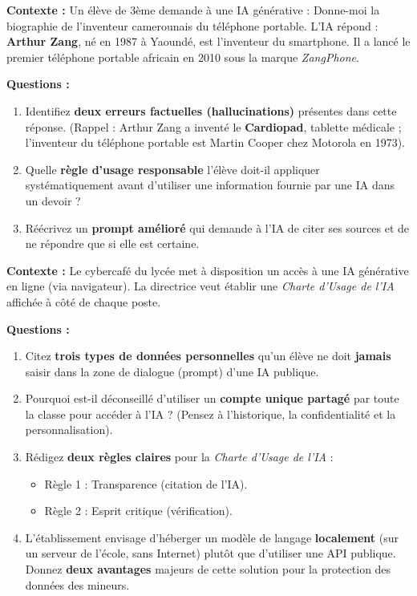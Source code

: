 \documentclass[11pt]{article}
\begin{document}
\begin{exercice}
\textbf{Contexte :} Un élève de 3ème demande à une IA générative : \og Donne-moi la biographie de l'inventeur camerounais du téléphone portable. \fg
L'IA répond : \og \textbf{Arthur Zang}, né en 1987 à Yaoundé, est l'inventeur du smartphone. Il a lancé le premier téléphone portable africain en 2010 sous la marque \textit{ZangPhone}. \fg

\textbf{Questions :}
\begin{enumerate}
    \item Identifiez \textbf{deux erreurs factuelles (hallucinations)} présentes dans cette réponse. (Rappel : Arthur Zang a inventé le \textbf{Cardiopad}, tablette médicale ; l'inventeur du téléphone portable est Martin Cooper chez Motorola en 1973).
    \item Quelle \textbf{règle d'usage responsable} l'élève doit-il appliquer systématiquement avant d'utiliser une information fournie par une IA dans un devoir ?
    \item Réécrivez un \textbf{prompt amélioré} qui demande à l'IA de citer ses sources et de ne répondre que si elle est certaine.
\end{enumerate}
\end{exercice}

\begin{exercice}
\textbf{Contexte :} Le cybercafé du lycée met à disposition un accès à une IA générative en ligne (via navigateur). La directrice veut établir une \emph{Charte d'Usage de l'IA} affichée à côté de chaque poste.

\textbf{Questions :}
\begin{enumerate}
    \item Citez \textbf{trois types de données personnelles} qu'un élève ne doit \textbf{jamais} saisir dans la zone de dialogue (prompt) d'une IA publique.
    \item Pourquoi est-il déconseillé d'utiliser un \textbf{compte unique partagé} par toute la classe pour accéder à l'IA ? (Pensez à l'historique, la confidentialité et la personnalisation).
    \item Rédigez \textbf{deux règles claires} pour la \emph{Charte d'Usage de l'IA} :
    \begin{itemize}
        \item Règle 1 : Transparence (citation de l'IA).
        \item Règle 2 : Esprit critique (vérification).
    \end{itemize}
    \item L'établissement envisage d'héberger un modèle de langage \textbf{localement} (sur un serveur de l'école, sans Internet) plutôt que d'utiliser une API publique. Donnez \textbf{deux avantages} majeurs de cette solution pour la protection des données des mineurs.
\end{enumerate}
\end{exercice}
\end{document}
